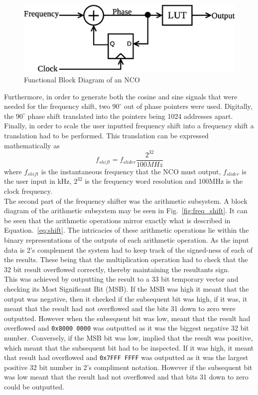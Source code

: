 		\begin{figure}[h!]
			\centering
			\includegraphics[width=0.7\linewidth]{img/NCO}
			\caption{Functional Block Diagram of an NCO}
			\label{fig:NCO}
		\end{figure}
		
		\noindent Furthermore, in order to generate both the cosine and sine signals that were needed for the frequency shift, two $90^\circ$ out of phase pointers were used. Digitally, the $90^\circ$ phase shift translated into the pointers being 1024 addresses apart. \\ \newline Finally, in order to scale the user inputted frequency shift into a frequency shift a translation had to be performed. This translation can be expressed mathematically as 
		\begin{equation}
			f_{shift } = f_{slider} \dfrac{2^{32}}{100MHz}
		\end{equation}
		\noindent where $f_{shift}$ is the instantaneous frequency that the NCO must output, $f_{slider}$ is the user input in kHz, $2^{32}$ is the frequency word resolution and 100MHz is the clock frequency. \\ \newline The second part of the frequency shifter was the arithmetic subsystem. A block diagram of the arithmetic subsystem may be seen in Fig.~\ref{fig:freq_shift}. It can be seen that the arithmetic operations mirror exactly what is described in Equation.~\ref{eq:shift}. The intricacies of these arithmetic operations lie within the binary representations of the outputs of each arithmetic operation. As the input data is 2's complement the system had to keep track of the signed-ness of each of the results. These being that the multiplication operation had to check that the 32 bit result overflowed correctly, thereby maintaining the resultants sign.  \\ \newline This was achieved by outputting the result to a 33 bit temporary vector and checking its Most Significant Bit (MSB). If the MSB was high it meant that the output was negative, then it checked if the subsequent bit was high, if it was, it meant that the result had not overflowed and the bits 31 down to zero were outputted. However when the subsequent bit was low, meant that the result had overflowed and \texttt{0x8000 0000} was outputted as it was the biggest negative 32 bit number. Conversely, if the MSB bit was low, implied that the result was positive, which meant that the subsequent bit had to be inspected. If it was high, it meant that result had overflowed and \texttt{0x7FFF FFFF} was outputted as it was the largest positive 32 bit number in 2's compliment notation. However if the subsequent bit was low meant that the result had not overflowed and that bits 31 down to zero could be outputted.
		

